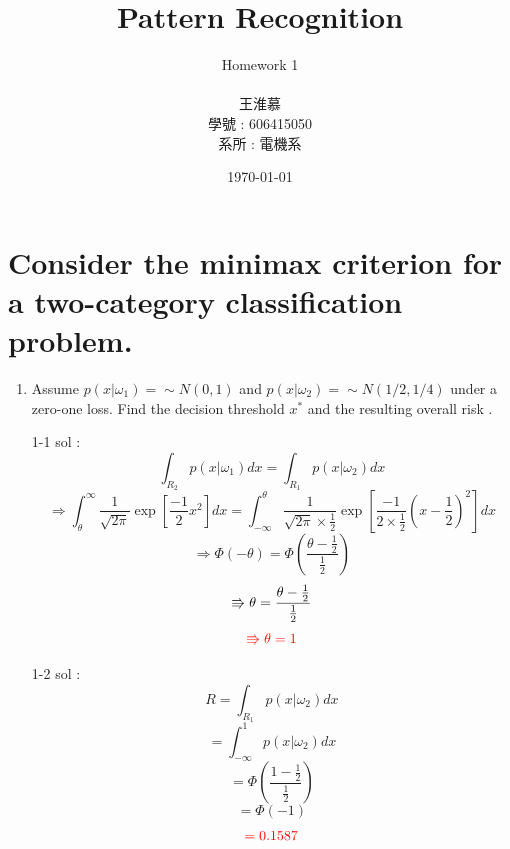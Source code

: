 \documentclass[14pt]{report}
\title{\Huge Pattern Recognition}
\author{\huge Homework 1  \\ \\王淮慕\\學號 : 606415050\\系所 : 電機系}
\date{\today}
\begin{document}
	
	\maketitle
	
	\section{Consider the minimax criterion for a two-category classification problem.}
	\begin{enumerate}
		\item Assume $p(x|\omega_1) = \sim N(0,1)$ and $p(x|\omega_2) = \sim N(1/2,1/4)$ under a zero-one loss. Find the decision threshold $x^\ast$ and the resulting overall risk .
		\item [1-1] sol :\\
		\[\int_{R_2}^{}p(x|\omega_1)dx=\int_{R_1}^{}p(x|\omega_2)dx \]
		\[\Rightarrow \int_{\theta}^{\infty}\frac{1}{\sqrt{2\pi}}\exp [\frac{-1}{2}x^2]dx
		=\int_{-\infty}^{\theta}\frac{1}{\sqrt{2\pi}\times \frac{1}{2}}\exp [\frac{-1}{2\times \frac{1}{2}}(x-\frac{1}{2})^2]dx \]
		\[\Rightarrow \Phi(-\theta)=\Phi(\frac{\theta-\frac{1}{2}}{\frac{1}{2}}) \]
		\[\Rrightarrow \-\theta=\frac{\theta-\frac{1}{2}}{\frac{1}{2}} \]
		\[\color{red} \Rrightarrow \theta =1\]
		\item [1-2] sol :\\
		\[R=\int_{R_1}^{}p(x|\omega_2)dx\]
		\[=\int_{-\infty}^{1}p(x|\omega_2)dx\]
		\[=\Phi(\frac{1-\frac{1}{2}}{\frac{1}{2}})\]
		\[=\Phi(-1)\]
		\[\color{red} =0.1587\]
	\end{enumerate}
	
\end{document}
